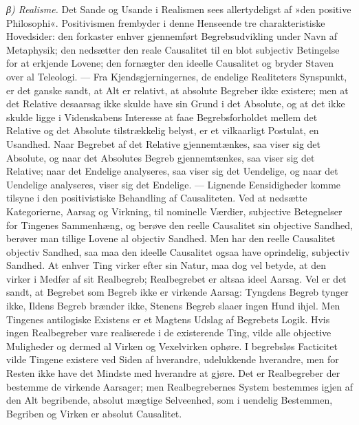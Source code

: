 \documentclass[12pt]{book}
\newcommand{\apage}[1]{\marginnote{\footnotesize\textit{[#1]}}}
\begin{document}
\emph{β) Realisme.} Det Sande og Usande i Realismen sees allertydeligst af
»den positive Philosophi«. Positivismen frembyder i denne Henseende tre
charakteristiske Hovedsider: den forkaster enhver gjennemført
Begrebsudvikling under Navn af Metaphysik; den nedsætter den reale
Causalitet til en blot subjectiv Betingelse for at erkjende Lovene; den
fornægter den ideelle Causalitet og bryder Staven over al Teleologi. ---
Fra \apage{115} Kjendsgjerningernes, de endelige Realiteters Synspunkt, er det ganske
sandt, at Alt er relativt, at absolute Begreber ikke existere; men at det
Relative desaarsag ikke skulde have sin Grund i det Absolute, og at det
ikke skulde ligge i Videnskabens Interesse at faae Begrebsforholdet mellem
det Relative og det Absolute tilstrækkelig belyst, er et vilkaarligt
Postulat, en Usandhed. Naar Begrebet af det Relative gjennemtænkes, saa
viser sig det Absolute, og naar det Absolutes Begreb gjennemtænkes, saa
viser sig det Relative; naar det Endelige analyseres, saa viser sig det
Uendelige, og naar det Uendelige analyseres, viser sig det Endelige.
--- Lignende Eensidigheder komme tilsyne i den positivistiske Behandling af
Causaliteten. Ved at nedsætte Kategorierne, Aarsag og Virkning, til
nominelle Værdier, subjective Betegnelser for Tingenes Sammenhæng, og
berøve den reelle Causalitet sin objective Sandhed, berøver man tillige
Lovene al objectiv Sandhed. Men har den reelle Causalitet objectiv Sandhed,
saa maa den ideelle Causalitet ogsaa have oprindelig, subjectiv Sandhed. At
enhver Ting virker efter sin Natur, maa dog vel betyde, at den virker i
Medfør af sit Realbegreb; Realbegrebet er altsaa ideel Aarsag. Vel er det
sandt, at Begrebet som Begreb ikke er virkende Aarsag: Tyngdens Begreb
tynger ikke, Ildens Begreb brænder ikke, Stenens Begreb slaaer ingen Hund
ihjel. Men Tingenes antilogiske Existens er et Magtens Udslag af Begrebets
Logik. Hvis ingen Realbegreber vare realiserede i de existerende Ting, vilde
alle objective Muligheder og dermed al Virken og Vexelvirken ophøre. I
begrebsløs \apage{116} Facticitet vilde Tingene existere ved Siden af hverandre,
udelukkende hverandre, men for Resten ikke have det Mindste med hverandre
at gjøre. Det er Realbegreber der bestemme de virkende Aarsager; men
Realbegrebernes System bestemmes igjen af den Alt begribende, absolut
mægtige Selveenhed, som i uendelig Bestemmen, Begriben og Virken er absolut
Causalitet.
\end{document}
